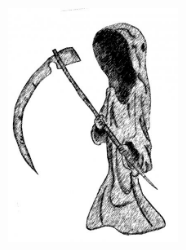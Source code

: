 \documentclass[a6paper, 10pt, twoside]{article}
\begin{document}
\begin{figure}[!h]
\hfill
\includegraphics[width=0.4\textwidth]{liemannen.jpg}
\end{figure}
\end{document}
